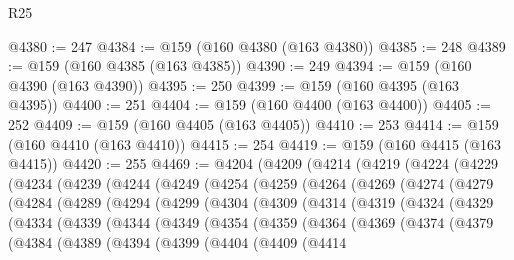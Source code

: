 \begin{lexlean}{R25}
\begin{coremodule}
{{{{{{{{{{{{{{{{{{{{{{{{{{{{{{{{{{{{{{{{{{{{{{{{{{{{{{{{{{{{{{{{{{{{{{{{{{{{{{{{{{{{{{{{{{{{{{{{{{{{{{{{{{{{{{{{{{{{{{{{{{{{{{{{{{{{{{{{{{{{{{{{{{{{{{{{{{{{{{{{{{{{{{{{{{{{{{{{{{{{{{{{{{{{{{{{{{{{{{{@4380 := 247
@4384 := @159 (@160 @4380 (@163 @4380))
@4385 := 248
@4389 := @159 (@160 @4385 (@163 @4385))
@4390 := 249
@4394 := @159 (@160 @4390 (@163 @4390))
@4395 := 250
@4399 := @159 (@160 @4395 (@163 @4395))
@4400 := 251
@4404 := @159 (@160 @4400 (@163 @4400))
@4405 := 252
@4409 := @159 (@160 @4405 (@163 @4405))
@4410 := 253
@4414 := @159 (@160 @4410 (@163 @4410))
@4415 := 254
@4419 := @159 (@160 @4415 (@163 @4415))
@4420 := 255
@4469 := @4204
    (@4209
      (@4214
        (@4219
          (@4224
            (@4229
              (@4234
                (@4239
                  (@4244
                    (@4249
                      (@4254
                        (@4259
                          (@4264
                            (@4269
                              (@4274
                                (@4279
                                  (@4284
                                    (@4289
                                      (@4294
                                        (@4299
                                          (@4304
                                            (@4309
                                              (@4314
                                                (@4319
                                                  (@4324
                                                    (@4329
                                                      (@4334
                                                        (@4339
                                                          (@4344
                                                            (@4349
                                                              (@4354
                                                                (@4359
                                                                  (@4364
                                                                    (@4369
                                                                      (@4374
                                                                        (@4379
                                                                          (@4384
                                                                            (@4389
                                                                              (@4394
                                                                                (@4399
                                                                                  (@4404
                                                                                    (@4409
                                                                                      (@4414
}}}}}}}}}}}}}}}}}}}}}}}}}}}}}}}}}}}}}}}}}}}}}}}}}}}}}}}}}}}}}}}}}}}}}}}}}}}}}}}}}}}}}}}}}}}}}}}}}}}}}}}}}}}}}}}}}}}}}}}}}}}}}}}}}}}}}}}}}}}}}}}}}}}}}}}}}}}}}}}}}}}}}}}}}}}}}}}}}}}}}}}}}}}}}}}}}}}}}}}
\end{coremodule}
\end{lexlean}
